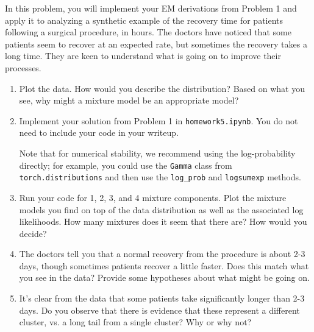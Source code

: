 \documentclass[submit]{../harvardml}
\begin{document}
\begin{problem}
  In this problem, you will implement your EM derivations from Problem
  1 and apply it to analyzing a synthetic example of the recovery time
  for patients following a surgical procedure, in hours.  The doctors
  have noticed that some patients seem to recover at an expected rate,
  but sometimes the recovery takes a long time.  They are keen to
  understand what is going on to improve their processes.  
  
  \begin{enumerate}
    \item Plot the data.  How would you describe the distribution?
    Based on what you see, why might a mixture model be an appropriate
    model?  
      
    \item Implement your solution from Problem 1 in \texttt{homework5.ipynb}. You do not need to include your code in your writeup.

    Note that for numerical stability, we recommend using the 
    log-probability directly; for example, you could use the \texttt{Gamma} class from \texttt{torch.distributions} and then use the \texttt{log\_prob} and \texttt{logsumexp} methods.

    \item Run your code for 1, 2, 3, and 4 mixture components.  Plot the
    mixture models you find on top of the data distribution as well as
    the associated log likelihoods.  How many mixtures does it seem that
    there are?  How would you decide?
  
    \item The doctors tell you that a normal recovery from the procedure
    is about 2-3 days, though sometimes patients recover a little
    faster.  Does this match what you see in the data?  Provide some
    hypotheses about what might be going on.

    \item It's clear from the data that some patients take significantly
    longer than 2-3 days.  Do you observe that there is evidence that
    these represent a different cluster, vs. a long tail from a single
    cluster?  Why or why not?


\end{enumerate}
\end{problem}
\end{document}
